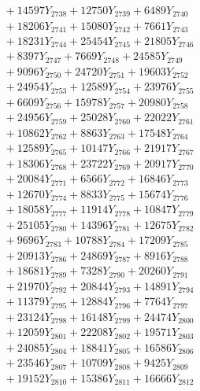 \documentclass[a4paper,10pt]{article}
\begin{document}
{\begin{align}
&\;  + 14597 Y_{2738} + 12750 Y_{2739} + 6489 Y_{2740} \\[0.3ex]
&\;  + 18206 Y_{2741} + 15080 Y_{2742} + 7661 Y_{2743} \\[0.3ex]
&\;  + 18231 Y_{2744} + 25454 Y_{2745} + 21805 Y_{2746} \\[0.3ex]
&\;  + 8397 Y_{2747} + 7669 Y_{2748} + 24585 Y_{2749} \\[0.3ex]
&\;  + 9096 Y_{2750} + 24720 Y_{2751} + 19603 Y_{2752} \\[0.3ex]
&\;  + 24954 Y_{2753} + 12589 Y_{2754} + 23976 Y_{2755} \\[0.3ex]
&\;  + 6609 Y_{2756} + 15978 Y_{2757} + 20980 Y_{2758} \\[0.5ex]\allowbreak
&\;  + 24956 Y_{2759} + 25028 Y_{2760} + 22022 Y_{2761} \\[0.3ex]
&\;  + 10862 Y_{2762} + 8863 Y_{2763} + 17548 Y_{2764} \\[0.3ex]
&\;  + 12589 Y_{2765} + 10147 Y_{2766} + 21917 Y_{2767} \\[0.3ex]
&\;  + 18306 Y_{2768} + 23722 Y_{2769} + 20917 Y_{2770} \\[0.3ex]
&\;  + 20084 Y_{2771} + 6566 Y_{2772} + 16846 Y_{2773} \\[0.3ex]
&\;  + 12670 Y_{2774} + 8833 Y_{2775} + 15674 Y_{2776} \\[0.3ex]
&\;  + 18058 Y_{2777} + 11914 Y_{2778} + 10847 Y_{2779} \\[0.3ex]
&\;  + 25105 Y_{2780} + 14396 Y_{2781} + 12675 Y_{2782} \\[0.3ex]
&\;  + 9696 Y_{2783} + 10788 Y_{2784} + 17209 Y_{2785} \\[0.3ex]
&\;  + 20913 Y_{2786} + 24869 Y_{2787} + 8916 Y_{2788} \\[0.5ex]\allowbreak
&\;  + 18681 Y_{2789} + 7328 Y_{2790} + 20260 Y_{2791} \\[0.3ex]
&\;  + 21970 Y_{2792} + 20844 Y_{2793} + 14891 Y_{2794} \\[0.3ex]
&\;  + 11379 Y_{2795} + 12884 Y_{2796} + 7764 Y_{2797} \\[0.3ex]
&\;  + 23124 Y_{2798} + 16148 Y_{2799} + 24474 Y_{2800} \\[0.3ex]
&\;  + 12059 Y_{2801} + 22208 Y_{2802} + 19571 Y_{2803} \\[0.3ex]
&\;  + 24085 Y_{2804} + 18841 Y_{2805} + 16586 Y_{2806} \\[0.3ex]
&\;  + 23546 Y_{2807} + 10709 Y_{2808} + 9425 Y_{2809} \\[0.3ex]
&\;  + 19152 Y_{2810} + 15386 Y_{2811} + 16666 Y_{2812} \\[0.3ex]

\end{align}}
\end{document}

